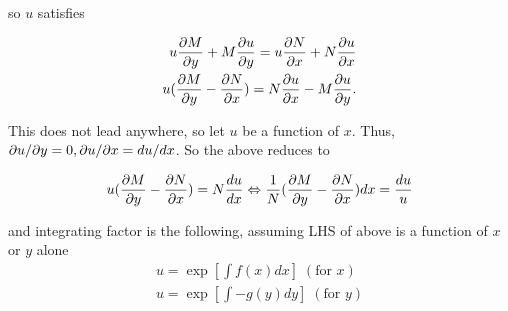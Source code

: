 so $u$ satisfies

\begin{eqnarray}
    u\frac{\partial M}{\partial y}+M\frac{\partial u}{\partial y}=u\frac{\partial N}{\partial x}+N\frac{\partial u}{\partial x}\\
    u(\frac{\partial M}{\partial y}-\frac{\partial N}{\partial x})=N\frac{\partial u}{\partial x}-M\frac{\partial u}{\partial y}.
\end{eqnarray}

This does not lead anywhere, so let $u$ be a function of $x$. Thus, $\partial u/\partial y=0,\partial u/\partial x=du/dx$.
So the above reduces to

\begin{equation}
    u(\frac{\partial M}{\partial y}-\frac{\partial N}{\partial x})=N\frac{du}{dx}\Leftrightarrow \frac{1}{N}(\frac{\partial M}{\partial y}-\frac{\partial N}{\partial x})dx=\frac{du}{u}
\end{equation}

and integrating factor is the following, assuming LHS of above is a function of $x$ or $y$ alone
\begin{eqnarray}
    u=\exp\left[\int f(x)dx\right]\;(\text{for $x$})\\
    u=\exp\left[\int -g(y)dy\right]\;(\text{for $y$})
\end{eqnarray}